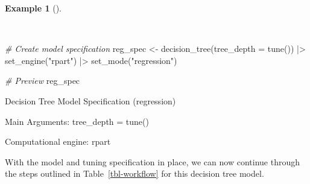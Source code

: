 \documentclass[
  letterpaper,
]{latex/krantz}
\newenvironment{Shaded}{\begin{snugshade}}{\end{snugshade}}
\newcommand{\AttributeTok}[1]{\textcolor[rgb]{0.00,0.00,0.00}{#1}}
\newcommand{\CommentTok}[1]{\textcolor[rgb]{0.00,0.00,0.00}{\textit{#1}}}
\newcommand{\FunctionTok}[1]{\textcolor[rgb]{0.00,0.00,0.00}{#1}}
\newcommand{\NormalTok}[1]{\textcolor[rgb]{0.00,0.00,0.00}{#1}}
\newcommand{\OtherTok}[1]{\textcolor[rgb]{0.00,0.00,0.00}{#1}}
\newcommand{\SpecialCharTok}[1]{\textcolor[rgb]{0.00,0.00,0.00}{#1}}
\newcommand{\StringTok}[1]{\textcolor[rgb]{0.00,0.00,0.00}{#1}}
\theoremstyle{definition}
\newtheorem{example}{Example}[chapter]
\theoremstyle{remark}
\begin{document}
\begin{example}[]\protect\hypertarget{exm-pda-reg-model-spec-decision-tree}{}\label{exm-pda-reg-model-spec-decision-tree}

~

\begin{Shaded}
\begin{Highlighting}[]
\CommentTok{\# Create model specification}
\NormalTok{reg\_spec }\OtherTok{\textless{}{-}}
  \FunctionTok{decision\_tree}\NormalTok{(}\AttributeTok{tree\_depth =} \FunctionTok{tune}\NormalTok{()) }\SpecialCharTok{|\textgreater{}}
  \FunctionTok{set\_engine}\NormalTok{(}\StringTok{"rpart"}\NormalTok{) }\SpecialCharTok{|\textgreater{}}
  \FunctionTok{set\_mode}\NormalTok{(}\StringTok{"regression"}\NormalTok{)}

\CommentTok{\# Preview}
\NormalTok{reg\_spec}
\end{Highlighting}
\end{Shaded}

\begin{Shaded}
\begin{Highlighting}[]
\NormalTok{Decision Tree Model Specification (regression)}

\NormalTok{Main Arguments:}
\NormalTok{  tree\_depth = tune()}

\NormalTok{Computational engine: rpart}
\end{Highlighting}
\end{Shaded}

\end{example}

With the model and tuning specification in place, we can now continue
through the steps outlined in Table~\ref{tbl-workflow} for this decision
tree model.
\end{document}
